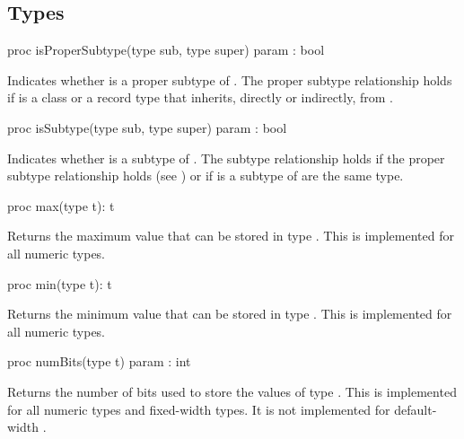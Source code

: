 \subsection{Types}
\label{Types_standard_module}

\begin{protohead}
proc isProperSubtype(type sub, type super) param : bool
\end{protohead}
\begin{protobody}
Indicates whether  is a proper subtype of .
The proper subtype relationship holds if  is a class or
a record type that inherits, directly or indirectly, from .
\end{protobody}

\begin{protohead}
proc isSubtype(type sub, type super) param : bool
\end{protohead}
\begin{protobody}
Indicates whether  is a subtype of .
The subtype relationship holds if the proper subtype relationship holds
(see ) or if  is a subtype of 
are the same type.
\end{protobody}

\begin{protohead}
proc max(type t): t
\end{protohead}
\begin{protobody}
Returns the maximum value that can be stored in type .  This
is implemented for all numeric types.
\end{protobody}

\begin{protohead}
proc min(type t): t
\end{protohead}
\begin{protobody}
Returns the minimum value that can be stored in type .  This
is implemented for all numeric types.
\end{protobody}

\begin{protohead}
proc numBits(type t) param : int
\end{protohead}
\begin{protobody}
Returns the number of bits used to store the values of type .
This is implemented for all numeric types and fixed-width  types.
It is not implemented for default-width .
\end{protobody}

